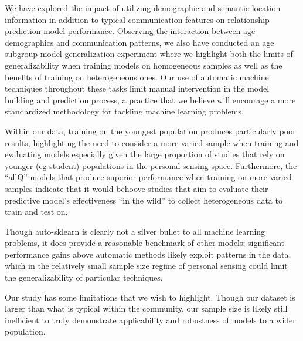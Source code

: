 \documentclass[acmlarge]{acmart}
\begin{document}
We have explored the impact of utilizing demographic and semantic location information in addition to typical communication features on relationship prediction model performance. Observing the interaction between age demographics and communication patterns, we also have conducted an age subgroup model generalization experiment where we highlight both the limits of generalizability when training models on homogeneous samples as well as the benefits of training on heterogeneous ones. Our use of automatic machine techniques throughout these tasks limit manual intervention in the model building and prediction process, a practice that we believe will encourage a more standardized methodology for tackling machine learning problems. 


Within our data, training on the youngest population produces particularly poor results, highlighting the need to consider a more varied sample when training and evaluating models especially given the large proportion of studies that rely on younger (eg student) populations in the personal sensing space. 
Furthermore, the ``allQ'' models that produce superior performance when training on more varied samples indicate that it would behoove studies that aim to evaluate their predictive model's effectiveness ``in the wild'' to collect heterogeneous data to train and test on.

Though auto-sklearn is clearly not a silver bullet to all machine learning problems, it does provide a reasonable benchmark of other models; significant performance gains above automatic methods likely exploit patterns in the data, which in the relatively small sample size regime of personal sensing could limit the generalizability of particular techniques.

Our study has some limitations that we wish to highlight. Though our dataset is larger than what is typical within the community, our sample size is likely still inefficient to truly demonstrate applicability and robustness of models to a wider population. %
\end{document}

